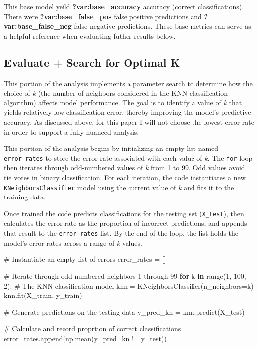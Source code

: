 \documentclass[
]{article}
\newenvironment{Shaded}{\begin{snugshade}}{\end{snugshade}}
\newcommand{\BuiltInTok}[1]{\textcolor[rgb]{0.00,0.23,0.31}{#1}}
\newcommand{\CommentTok}[1]{\textcolor[rgb]{0.37,0.37,0.37}{#1}}
\newcommand{\ControlFlowTok}[1]{\textcolor[rgb]{0.00,0.23,0.31}{\textbf{#1}}}
\newcommand{\DecValTok}[1]{\textcolor[rgb]{0.68,0.00,0.00}{#1}}
\newcommand{\KeywordTok}[1]{\textcolor[rgb]{0.00,0.23,0.31}{\textbf{#1}}}
\newcommand{\NormalTok}[1]{\textcolor[rgb]{0.00,0.23,0.31}{#1}}
\newcommand{\OperatorTok}[1]{\textcolor[rgb]{0.37,0.37,0.37}{#1}}
\begin{document}
This base model yeild \textbf{?var:base\_accuracy} accuracy (correct
classifications). There were \textbf{?var:base\_false\_pos} false
positive predictions and \textbf{?var:base\_false\_neg} false negative
predictions. These base metrics can serve as a helpful reference when
evaluating futher results below.

\subsection{Evaluate + Search for Optimal
K}\label{evaluate-search-for-optimal-k}

This portion of the analysis implements a parameter search to determine
how the choice of \emph{k} (the number of neighbors considered in the
KNN classification algorithm) affects model performance. The goal is to
identify a value of \emph{k} that yields relatively low classification
error, thereby improving the model's predictive accuracy. As discussed
above, for this paper I will not choose the lowest error rate in order
to support a fully nuanced analysis.

This portion of the analysis begins by initializing an empty list named
\texttt{error\_rates} to store the error rate associated with each value
of \emph{k}. The \texttt{for} loop then iterates through odd-numbered
values of \emph{k} from 1 to 99. Odd values avoid tie votes in binary
classification. For each iteration, the code instantiates a new
\texttt{KNeighborsClassifier} model using the current value of \emph{k}
and fits it to the training data.

Once trained the code predicts classifications for the testing set
(\texttt{X\_test}), then calculates the error rate as the proportion of
incorrect predictions, and appends that result to the
\texttt{error\_rates} list. By the end of the loop, the list holds the
model's error rates across a range of \emph{k} values.

\begin{Shaded}
\begin{Highlighting}[]
\CommentTok{\# Instantiate an empty list of errors}
\NormalTok{error\_rates }\OperatorTok{=}\NormalTok{ []}

\CommentTok{\# Iterate through odd numbered neighbors 1 through 99}
\ControlFlowTok{for}\NormalTok{ k }\KeywordTok{in} \BuiltInTok{range}\NormalTok{(}\DecValTok{1}\NormalTok{, }\DecValTok{100}\NormalTok{, }\DecValTok{2}\NormalTok{):}
    \CommentTok{\# The KNN classification model}
\NormalTok{    knn }\OperatorTok{=}\NormalTok{ KNeighborsClassifier(n\_neighbors}\OperatorTok{=}\NormalTok{k)}
\NormalTok{    knn.fit(X\_train, y\_train)}
    
    \CommentTok{\# Generate predictions on the testing data}
\NormalTok{    y\_pred\_kn }\OperatorTok{=}\NormalTok{ knn.predict(X\_test)}
    
    \CommentTok{\# Calculate and record proprtion of correct classifications}
\NormalTok{    error\_rates.append(np.mean(y\_pred\_kn }\OperatorTok{!=}\NormalTok{ y\_test))}
\end{Highlighting}
\end{Shaded}
\end{document}
